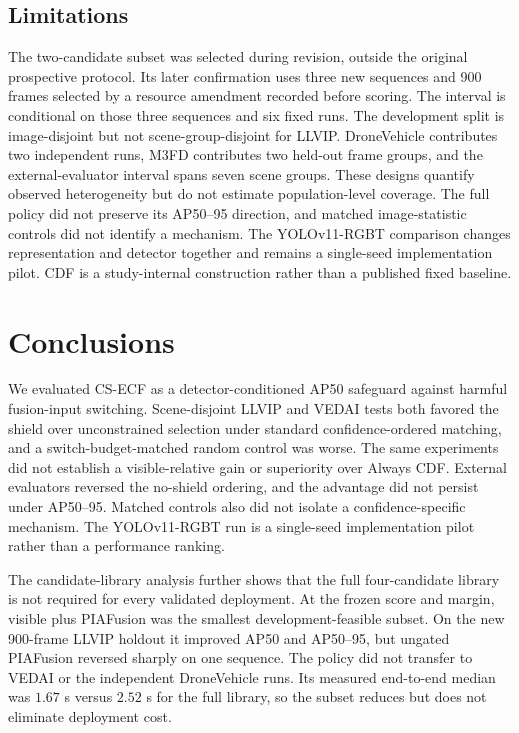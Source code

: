\documentclass[preprint,11pt]{elsarticle}
\begin{document}
\subsection*{Limitations}

The two-candidate subset was selected during revision, outside the original
prospective protocol. Its later confirmation uses three new sequences and 900
frames selected by a resource amendment recorded before scoring. The interval
is conditional on those three sequences and six fixed runs. The development
split is image-disjoint but not scene-group-disjoint for LLVIP. DroneVehicle
contributes two independent runs, M3FD contributes two held-out frame groups,
and the external-evaluator interval spans seven scene groups. These designs
quantify observed heterogeneity but do not estimate population-level coverage.
The full policy did not preserve its AP50--95 direction, and matched
image-statistic controls did not identify a mechanism. The YOLOv11-RGBT
comparison changes representation and detector together and remains a
single-seed implementation pilot. CDF is a study-internal construction rather
than a published fixed baseline.

\section{Conclusions}

We evaluated CS-ECF as a detector-conditioned AP50 safeguard against harmful
fusion-input switching. Scene-disjoint LLVIP and VEDAI tests both favored the
shield over unconstrained selection under standard confidence-ordered matching,
and a switch-budget-matched random control was worse. The same experiments did
not establish a visible-relative gain or superiority over Always CDF. External
evaluators reversed the no-shield ordering, and the advantage did not persist
under AP50--95. Matched controls also did not isolate a confidence-specific
mechanism. The YOLOv11-RGBT run is a single-seed implementation pilot rather
than a performance ranking.

The candidate-library analysis further shows that the full four-candidate
library is not required for every validated deployment. At the frozen score
and margin, visible plus PIAFusion was the smallest development-feasible
subset. On the new 900-frame LLVIP holdout it improved AP50 and AP50--95, but
ungated PIAFusion reversed sharply on one sequence. The policy did not transfer
to VEDAI or the independent DroneVehicle runs. Its measured end-to-end median
was \(1.67\) s versus \(2.52\) s for the full library, so the subset reduces
but does not eliminate deployment cost.
\end{document}
